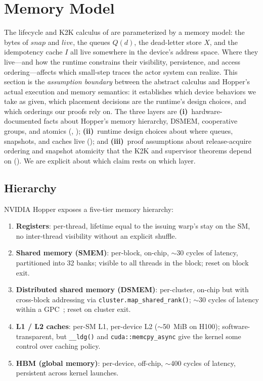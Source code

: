\section{Memory Model}
\label{sec:memory}

The lifecycle and K2K calculus of  are
parameterized by a memory model: the bytes of \(\mathit{snap}\) and
\(\mathit{live}\), the queues \(Q(d)\), the dead-letter store \(X\),
and the idempotency cache \(I\) all live somewhere in the device's
address space.  Where they live—and how the runtime constrains
their visibility, persistence, and access ordering—affects which
small-step traces the actor system can realize.  This section is
the \emph{assumption boundary} between the abstract calculus and
Hopper's actual execution and memory semantics: it establishes
which device behaviors we take as given, which placement decisions
are the runtime's design choices, and which orderings our proofs
rely on.  The three layers are
\textbf{(i)}~hardware-documented facts about Hopper's memory
hierarchy, DSMEM, cooperative groups, and atomics
(,
\citet{nvidia2022hopper,nvidia2023cooperative,nvidia2023hopperguide});
\textbf{(ii)}~runtime design choices about where queues,
snapshots, and caches live
();
and \textbf{(iii)}~proof assumptions about release-acquire
ordering and snapshot atomicity that the K2K and supervisor
theorems depend on
().  We are
explicit about which claim rests on which layer.

\subsection{Hierarchy}
\label{sec:memory:hierarchy}

NVIDIA Hopper exposes a five-tier memory hierarchy:

\begin{enumerate}
\item \textbf{Registers}: per-thread, lifetime equal to the
issuing warp's stay on the SM, no inter-thread visibility without an
explicit shuffle.
\item \textbf{Shared memory (SMEM)}: per-block, on-chip, $\sim$30
cycles of latency, partitioned into 32 banks; visible to all threads
in the block; reset on block exit.
\item \textbf{Distributed shared memory (DSMEM)}: per-cluster,
on-chip but with cross-block addressing via
\texttt{cluster.map\_shared\_rank()}; $\sim$30 cycles of latency
within a GPC~\citep{nvidia2022hopper}; reset on cluster exit.
\item \textbf{L1 / L2 caches}: per-SM L1, per-device L2 ($\sim$50~MiB
on H100); software-transparent, but \texttt{\_\_ldg()} and
\texttt{cuda::memcpy\_async} give the kernel some control over
caching policy.
\item \textbf{HBM (global memory)}: per-device, off-chip, $\sim$400
cycles of latency, persistent across kernel launches.
\end{enumerate}

